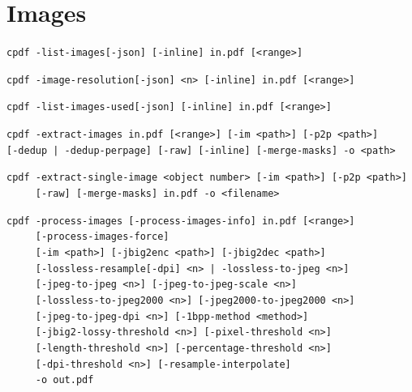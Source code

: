 \documentclass{book}
\begin{document}
\chapter{Images}\label{chap:13}
\begin{framed}

\noindent\small\verb!cpdf -list-images[-json] [-inline] in.pdf [<range>]!

\vspace{1.5mm}
\noindent\small\verb!cpdf -image-resolution[-json] <n> [-inline] in.pdf [<range>]!

\vspace{1.5mm}
\noindent\small\verb!cpdf -list-images-used[-json] [-inline] in.pdf [<range>]!

\vspace{1.5mm}
\noindent\small\verb!cpdf -extract-images in.pdf [<range>] [-im <path>] [-p2p <path>]!
\noindent\small\verb!     [-dedup | -dedup-perpage] [-raw] [-inline] [-merge-masks] -o <path>!

\vspace{1.5mm}
\noindent\small\verb!cpdf -extract-single-image <object number> [-im <path>] [-p2p <path>]!\\
\noindent\small\verb!     [-raw] [-merge-masks] in.pdf -o <filename>!

\vspace{1.5mm}
\noindent\small\verb!cpdf -process-images [-process-images-info] in.pdf [<range>]!\\
\noindent\small\verb!     [-process-images-force]!\\
\noindent\small\verb!     [-im <path>] [-jbig2enc <path>] [-jbig2dec <path>]!\\
\noindent\small\verb!     [-lossless-resample[-dpi] <n> | -lossless-to-jpeg <n>]!\\
\noindent\small\verb!     [-jpeg-to-jpeg <n>] [-jpeg-to-jpeg-scale <n>]!\\
\noindent\small\verb!     [-lossless-to-jpeg2000 <n>] [-jpeg2000-to-jpeg2000 <n>]!\\
\noindent\small\verb!     [-jpeg-to-jpeg-dpi <n>] [-1bpp-method <method>]!\\
\noindent\small\verb!     [-jbig2-lossy-threshold <n>] [-pixel-threshold <n>]!\\
\noindent\small\verb!     [-length-threshold <n>] [-percentage-threshold <n>]!\\
\noindent\small\verb!     [-dpi-threshold <n>] [-resample-interpolate]!\\
\noindent\small\verb!     -o out.pdf!


\end{framed}
\end{document}
